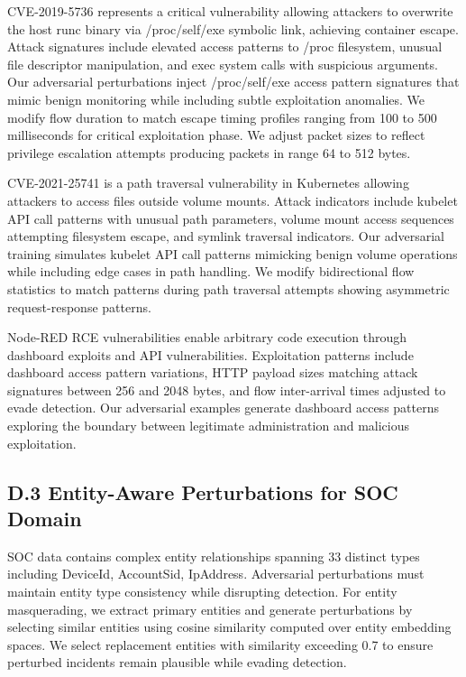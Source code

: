 \documentclass[12pt,a4paper]{article}
\theoremstyle{definition}
\begin{document}
CVE-2019-5736 represents a critical vulnerability allowing attackers to overwrite the host runc binary via /proc/self/exe symbolic link, achieving container escape. Attack signatures include elevated access patterns to /proc filesystem, unusual file descriptor manipulation, and exec system calls with suspicious arguments. Our adversarial perturbations inject /proc/self/exe access pattern signatures that mimic benign monitoring while including subtle exploitation anomalies. We modify flow duration to match escape timing profiles ranging from 100 to 500 milliseconds for critical exploitation phase. We adjust packet sizes to reflect privilege escalation attempts producing packets in range 64 to 512 bytes.

CVE-2021-25741 is a path traversal vulnerability in Kubernetes allowing attackers to access files outside volume mounts. Attack indicators include kubelet API call patterns with unusual path parameters, volume mount access sequences attempting filesystem escape, and symlink traversal indicators. Our adversarial training simulates kubelet API call patterns mimicking benign volume operations while including edge cases in path handling. We modify bidirectional flow statistics to match patterns during path traversal attempts showing asymmetric request-response patterns.

Node-RED RCE vulnerabilities enable arbitrary code execution through dashboard exploits and API vulnerabilities. Exploitation patterns include dashboard access pattern variations, HTTP payload sizes matching attack signatures between 256 and 2048 bytes, and flow inter-arrival times adjusted to evade detection. Our adversarial examples generate dashboard access patterns exploring the boundary between legitimate administration and malicious exploitation.

\subsection{D.3 Entity-Aware Perturbations for SOC Domain}

SOC data contains complex entity relationships spanning 33 distinct types including DeviceId, AccountSid, IpAddress. Adversarial perturbations must maintain entity type consistency while disrupting detection. For entity masquerading, we extract primary entities and generate perturbations by selecting similar entities using cosine similarity computed over entity embedding spaces. We select replacement entities with similarity exceeding 0.7 to ensure perturbed incidents remain plausible while evading detection.
\end{document}
